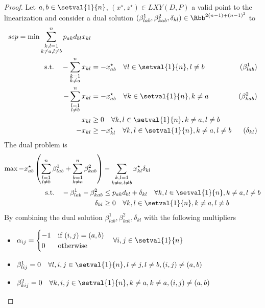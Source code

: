 \begin{proof}
	Let $a,b\in\setval{1}{n}$, $(x^\star,z^\star)\in LXY(D,P)$ a valid point to the linearization and consider a dual solution $(\beta^1_{lab}, \beta^2_{kab}, \delta_{kl})\in\Rbb^{2(n-1)+(n-1)^2}$ to 
	\begin{align*}
		sep = \min \sum_{\substack{k,l=1\\k\neq a, l\neq b}}^n p_{ak}d_{bl}x_{kl}&\\
		\text{s.t.}\quad-\sum_{\substack{k=1\\k\neq a}}^nx_{kl}&=-x^\star_{ab}\quad\forall l\in\setval{1}{n}, l\neq b &(\beta^1_{lab})\\
		-\sum_{\substack{l=1\\l\neq b}}^nx_{kl}&=-x^\star_{ab}\quad\forall k\in\setval{1}{n}, k\neq a &(\beta^2_{kab})\\
		x_{kl}&\geq 0\quad\forall k,l\in\setval{1}{n}, k\neq a, l\neq b\\
		-x_{kl}&\geq -x^\star_{kl}\quad\forall k,l\in\setval{1}{n}, k\neq a, l\neq b&(\delta_{kl})
	\end{align*}
	The dual problem is
	\begin{align*}
		\max -x^\star_{ab}\left(\sum_{\substack{l=1\\l\neq b}}^n\beta^1_{lab} + \sum_{\substack{k=1\\k\neq a}}^n\beta^2_{kab}\right) &- \sum_{\substack{k,l=1\\k\neq a, l\neq b}}x^\star_{kl}\delta_{kl}\\
		\text{s.t.}\quad-\beta^1_{lab} - \beta^2_{kab}&\leq p_{ak}d_{bl}+\delta_{kl}\quad\forall k,l\in\setval{1}{n}, k\neq a, l\neq b\\
		\delta_{kl}&\geq 0 \quad\forall k,l\in\setval{1}{n}, k\neq a, l\neq b
	\end{align*}
	By combining the dual solution $\beta^1_{lab}, \beta^2_{kab}, \delta_{kl}$ with the following multipliers
	\begin{itemize}
		\item $\alpha_{ij} = 
			\begin{cases}
				-1&\text{if }(i,j) = (a,b)\\
				0&\text{otherwise}
			\end{cases}
			\quad\forall i,j \in\setval{1}{n}$
		\item $\beta^1_{lij} = 0\quad\forall l,i,j\in\setval{1}{n}, l\neq j, l\neq b, (i,j) \neq (a,b)$
		\item $\beta^2_{kij} = 0\quad\forall k,i,j\in\setval{1}{n}, k\neq a, k \neq a, (i,j) \neq (a,b)$

\end{itemize}
\end{proof}
